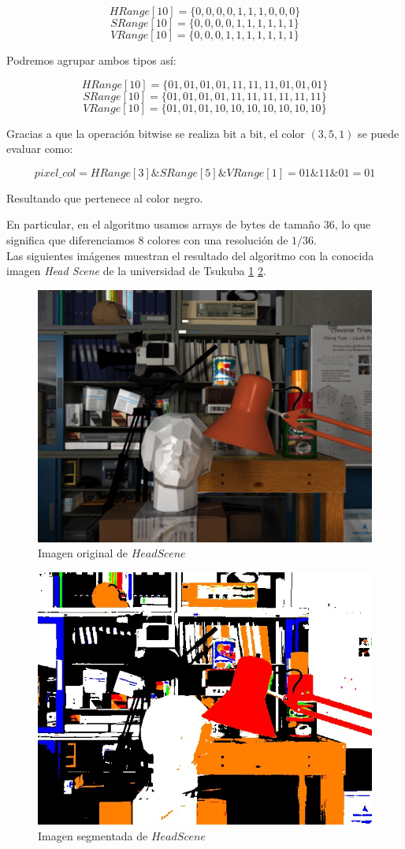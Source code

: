 {\centering
\[HRange[10] = \{0, 0, 0, 0, 1, 1, 1, 0, 0, 0\}\]
\[SRange[10] = \{0, 0, 0, 0, 1, 1, 1, 1, 1, 1\}\]
\[VRange[10] = \{0, 0, 0, 1, 1, 1, 1, 1, 1, 1\}\]
}

Podremos agrupar ambos tipos así:

{\centering
\[HRange[10] = \{01, 01, 01, 01, 11, 11, 11, 01, 01, 01\}\]
\[SRange[10] = \{01, 01, 01, 01, 11, 11, 11, 11, 11, 11\}\]
\[VRange[10] = \{01, 01, 01, 10, 10, 10, 10, 10, 10, 10\}\] 
} 

Gracias a que la operaci\'on bitwise se realiza bit a bit, el color $(3,5,1)$ se puede evaluar como: 

\[pixel\_col = HRange[3] \& SRange[5] \& VRange[1] = 01 \& 11 \& 01 = 01\]

Resultando que pertenece al color negro.

En particular, en el algoritmo usamos arrays de bytes de tamaño 36, lo que significa que diferenciamos 8 colores con una resoluci\'on de $1/36$. \\

Las siguientes imágenes muestran el resultado del algoritmo con la conocida imagen \textit{Head Scene}  de la universidad de Tsukuba \ref{fig:head_scene_tsukuba_ori} \ref{fig:head_scene_tsukuba_seg}. \\


\begin{figure}[hbp]
	\centering
	\includegraphics[width=0.4\linewidth]{../Images/c2/head_scene_tsukuba_ori}
	\caption{Imagen original de $Head Scene$}
	\label{fig:head_scene_tsukuba_ori}
\end{figure}

\begin{figure}[htp]
	\centering
	\includegraphics[width=0.4\linewidth]{../Images/c2/head_scene_tsukuba_seg}
	\caption{Imagen segmentada de $Head Scene$}
	\label{fig:head_scene_tsukuba_seg}
\end{figure}



